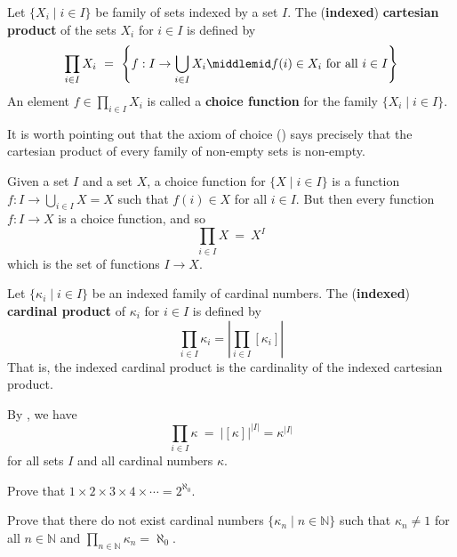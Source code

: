 \begin{definition}
\label{defIndexedCartesianProduct}
Let $\{ X_i \mid i \in I \}$ be family of sets indexed by a set $I$. The (\textbf{indexed}) \textbf{cartesian product} of the sets $X_i$ for $i \in I$ is defined by
\[ \prod_{i \in I} X_i ~=~ \left\{ f : I \to \bigcup_{i \in I} X_i \middlemid f(i) \in X_i \text{ for all } i \in I \right\} \]
An element $f \in \prod_{i \in I} X_i$ is called a \textbf{choice function} for the family $\{ X_i \mid i \in I \}$.
\end{definition}

It is worth pointing out that the axiom of choice () says precisely that the cartesian product of every family of non-empty sets is non-empty.

\begin{example}
\label{exCartesianProductOfConstantFamily}
Given a set $I$ and a set $X$, a choice function for $\{ X \mid i \in I \}$ is a function $\displaystyle f : I \to \bigcup_{i \in I} X = X$ such that $f(i) \in X$ for all $i \in I$. But then every function $f : I \to X$ is a choice function, and so
\[ \prod_{i \in I} X ~=~ X^I \]
which is the set of functions $I \to X$.
\end{example}

\begin{definition}
\label{defIndexedCardinalProduct}
Let $\{ \kappa_i \mid i \in I \}$ be an indexed family of cardinal numbers. The (\textbf{indexed}) \textbf{cardinal product} of $\kappa_i$ for $i \in I$ is defined by
\[ \prod_{i \in I} \kappa_i = \left| \prod_{i \in I} [\kappa_i] \right| \]
That is, the indexed cardinal product is the cardinality of the indexed cartesian product.
\end{definition}

\begin{example}
By , we have
\[ \prod_{i \in I} \kappa ~=~ |[\kappa]|^{|I|} = \kappa^{|I|} \]
for all sets $I$ and all cardinal numbers $\kappa$.
\end{example}

\begin{exercise}
Prove that $1 \times 2 \times 3 \times 4 \times \cdots = 2^{\aleph_0}$.
\end{exercise}

\begin{exercise}
Prove that there do not exist cardinal numbers $\{ \kappa_n \mid n \in \mathbb{N} \}$ such that $\kappa_n \ne 1$ for all $n \in \mathbb{N}$ and $\displaystyle \prod_{n \in \mathbb{N}} \kappa_n = \aleph_0$.
\end{exercise}
